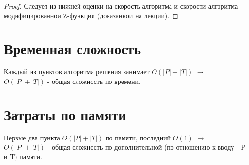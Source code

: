 \documentclass{article}
\begin{document}
\begin{proof}
    Следует из нижней оценки на скорость алгоритма и скорости алгоритма модифицированной Z-функции (доказанной на лекции).
\end{proof}

\section{Временная сложность}
Каждый из пунктов алгоритма решения занимает $O(|P| + |T|)$ $\to$ $O(|P| + |T|)$ - общая сложность по времени.

\section{Затраты по памяти}
Первые два пункта $O(|P| + |T|)$ по памяти, последний $O(1)$ $\to$ $O(|P| + |T|)$ - общая сложность по дополнительной (по отношению к вводу - P и T) памяти.
\end{document}
